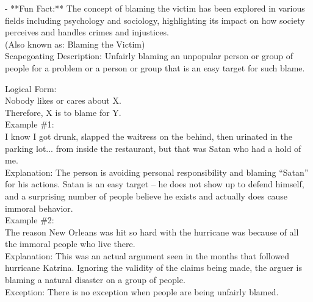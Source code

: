 \documentclass[a4paper,12pt,single,pdftex]{scrartcl}
\begin{document}
    
      - **Fun Fact:** The concept of blaming the victim has been explored in various fields including psychology and sociology, highlighting its impact on how society perceives and handles crimes and injustices.
    \\

  
    
      (Also known as: Blaming the Victim)
    \\

  

Scapegoating
    Description: Unfairly blaming an unpopular person or group of people for a problem or a person or group that is an easy target for such blame.

    
      Logical Form:
    \\

    
      Nobody likes or cares about X.
    \\

    
      Therefore, X is to blame for Y.
    \\

    
      Example \#1:
    \\

    
      I know I got drunk, slapped the waitress on the behind, then urinated in the parking lot... from inside the restaurant, but that was Satan who had a hold of me.
    \\

    
      Explanation: The person is avoiding personal responsibility and blaming “Satan” for his actions.  Satan is an easy target -- he does not show up to defend himself, and a surprising number of people believe he exists and actually does cause immoral behavior.
    \\

    
      Example \#2:
    \\

    
      The reason New Orleans was hit so hard with the hurricane was because of all the immoral people who live there.
    \\

    
      Explanation: This was an actual argument seen in the months that followed hurricane Katrina.  Ignoring the validity of the claims being made, the arguer is blaming a natural disaster on a group of people.
    \\

    
      Exception: There is no exception when people are being unfairly blamed.
    \\
\end{document}
